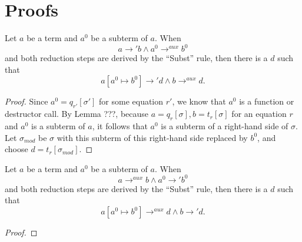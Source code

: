 \chapter{Proofs}

\begin{lemma}
Let $a$ be a term and $a^0$ be a subterm of $a$. When
\[
a \longrightarrow' b \land a^0 \longrightarrow^{aux} b^0
\]
and both reduction steps are derived by the ``Subst'' rule, then there is a $d$ such that
\[
a[a^0 \mapsto b^0] \longrightarrow' d \land b \longrightarrow^{aux} d.
\]

\begin{proof}
Since $a^0 = q_{r'}[\sigma']$ for some equation $r'$, we know that $a^0$ is a function or destructor call. By Lemma ???, because $a = q_r[\sigma], b = t_r[\sigma]$ for an equation $r$ and $a^0$ is a subterm of $a$, it follows that $a^0$ is a subterm of a right-hand side of $\sigma$. Let $\sigma_{mod}$ be $\sigma$ with this subterm of this right-hand side replaced by $b^0$, and choose $d = t_r[\sigma_{mod}]$.
\end{proof}
\end{lemma}

\begin{lemma}
Let $a$ be a term and $a^0$ be a subterm of $a$. When
\[
a \longrightarrow^{aux} b \land a^0 \longrightarrow' b^0
\]
and both reduction steps are derived by the ``Subst'' rule, then there is a $d$ such that
\[
a[a^0 \mapsto b^0] \longrightarrow^{aux} d \land b \longrightarrow' d.
\]

\begin{proof}
\end{proof}
\end{lemma}


